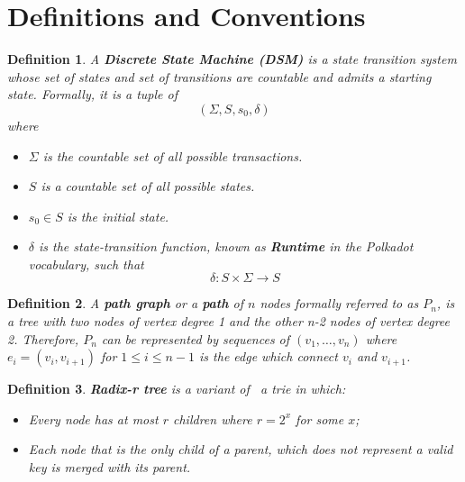 \documentclass{book}
\newcommand{\tmstrong}[1]{\textbf{#1}}
\newtheorem{definition}{Definition}
\newtheorem{definition}{Definition}
\begin{document}
\section{Definitions and Conventions}\label{sect-defn-conv}

\begin{definition}
  \label{defn-state-machine}A {\tmstrong{Discrete State Machine (DSM)}} is a
  state transition system whose set of states and set of transitions are
  countable and admits a starting state. Formally, it is a tuple of
  \[  (\Sigma, S, s_0, \delta) \]
  where
  \begin{itemize}
    \item $\Sigma$ is the countable set of all possible transactions.
    
    \item $S$ is a countable set of all possible states.
    
    \item $s_0 \in S$ is the initial state.
    
    \item $\delta$ is the state-transition function, known as
    \label{defn-runtime}{\tmstrong{Runtime}} in the Polkadot vocabulary, such
    that
    \[ \delta : S \times \Sigma \rightarrow S \]
  \end{itemize}
\end{definition}

\begin{definition}
  \label{defn-path-graph}A {\tmstrong{path graph}} or a {\tmstrong{path}} of
  $n$ nodes formally referred to as {\tmstrong{$P_n$}}, is a tree with two
  nodes of vertex degree 1 and the other n-2 nodes of vertex degree 2.
  Therefore, $P_n$ can be represented by sequences of $(v_1, \ldots, v_n)$
  where $e_i = (v_i, v_{i + 1})$ for $1 \leqslant i \leqslant n - 1$ is the
  edge which connect $v_i$ and $v_{i + 1}$.
\end{definition}

\begin{definition}
  \label{defn-radix-tree}{\tmstrong{Radix-r tree}} is a variant of \ a trie in
  which:
  \begin{itemize}
    \item Every node has at most $r$ children where $r = 2^x$ for some $x$;
    
    \item Each node that is the only child of a parent, which does not
    represent a valid key is merged with its parent.
  \end{itemize}
\end{definition}
\end{document}
